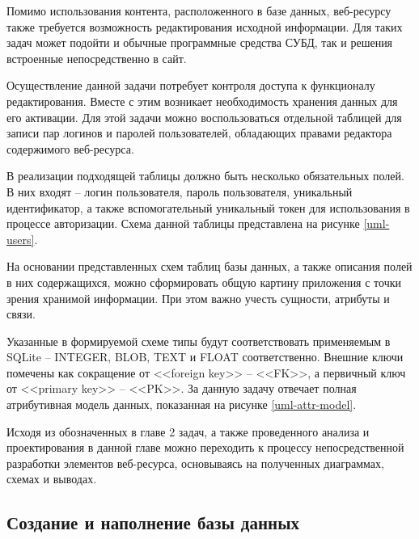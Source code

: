 
Помимо использования контента, расположенного в базе данных, веб-ресурсу также требуется возможность редактирования исходной информации.
Для таких задач может подойти и обычные программные средства СУБД, так и решения встроенные непосредственно в сайт.

Осуществление данной задачи потребует контроля доступа к функционалу редактирования.
Вместе с этим возникает необходимость хранения данных для его активации.
Для этой задачи можно воспользоваться отдельной таблицей для записи пар логинов и паролей пользователей, обладающих правами редактора содержимого веб-ресурса.

В реализации подходящей таблицы должно быть несколько обязательных полей.
В них входят -- логин пользователя, пароль пользователя, уникальный идентификатор, а также вспомогательный уникальный токен для использования в процессе авторизации.
Схема данной таблицы представлена на рисунке \ref{uml-users}.


На основании представленных схем таблиц базы данных, а также описания полей в них содержащихся, можно сформировать общую картину приложения с точки зрения хранимой информации.
При этом важно учесть сущности, атрибуты и связи.

Указанные в формируемой схеме типы будут соответствовать применяемым в SQLite -- INTEGER, BLOB, TEXT и FLOAT соответственно.
Внешние ключи помечены как сокращение от <<foreign key>> -- <<FK>>, а первичный ключ от <<primary key>> -- <<PK>>.
За данную задачу отвечает полная атрибутивная модель данных, показанная на рисунке \ref{uml-attr-model}.


Исходя из обозначенных в главе 2 задач, а также проведенного анализа и проектирования в данной главе можно переходить к процессу непосредственной разработки элементов веб-ресурса, основываясь на полученных диаграммах, схемах и выводах.


\subsection{Создание и наполнение базы данных}

